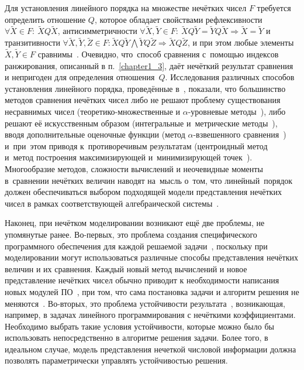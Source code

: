 Для установления линейного порядка на множестве нечётких чисел $F$ требуется определить отношение $Q$, которое обладает свойствами рефлексивности $\forall \tilde X \in F:\ \tilde X Q \tilde X$, антисимметричности $\forall \tilde X, \tilde Y \in F:\allowbreak\ \tilde X Q \tilde Y = \tilde Y Q \tilde X \Rightarrow \tilde X = \tilde Y$ и транзитивности $\forall \tilde X, \tilde Y, \tilde Z \in F:\allowbreak \tilde X Q \tilde Y \bigwedge \tilde Y Q \tilde Z \Rightarrow \tilde X Q \tilde Z$, и при этом любые элементы $\tilde X, \tilde Y \in F$ сравнимы~\cite{Vorontsov_Compare}. Очевидно, что~способ сравнения с~помощью индексов ранжирования, описанный в п.~\ref{chapter1_3}, даёт нечёткий результат сравнения и непригоден для определения отношения~$Q$. Исследования различных способов установления линейного порядка, проведённые в~\cite{Vorontsov_Compare}, показали, что большинство методов сравнения нечётких чисел либо не решают проблему существования несравнимых чисел (теоретико-множественные и $\alpha$-уровневые методы~\cite{Cheng_Comparison, Zak}), либо решают её искусственным образом (интегральные и~метрические методы~\cite{Skorokhod, Ledeneva_Nguen}), вводя дополнительные оценочные функции (метод $\alpha$-взвешенного сравнения~\cite{Detyniecki_Yager, Ukhobotov_Comparison, Ledeneva_VSTU_Comparison}) и~при~этом приводя к~противоречивым результатам (центроидный метод~\cite{Centroid} и~метод построения максимизирующей и~минимизирующей точек~\cite{Max_Min_Points}). Многообразие методов, сложности вычислений и неочевидные моменты в~сравнении нечётких величин наводят на~мысль о~том, что линейный~порядок должен обеспечиваться выбором подходящей модели представления нечётких чисел в рамках соответствующей алгебраической системы~\cite{Kosinski}.

Наконец, при нечётком моделировании возникают ещё две проблемы, не упомянутые ранее. Во-первых, это проблема создания специфического программного обеспечения для каждой решаемой задачи~\cite{Uskov_Complex}, поскольку при моделировании могут использоваться различные способы представления нечётких величин и их сравнения. Каждый новый метод вычислений и новое представление нечётких чисел обычно приводит к необходимости написания новых модулей ПО~\cite{Gallyamov}, при том, что сама постановка задачи и алгоритм решения не меняются~\cite{Koroteev_Fuzzy_Arithmetics}. Во-вторых, это проблема устойчивости результата~\cite{Fuller}, возникающая, например, в задачах линейного программирования с нечёткими коэффициентами.  Необходимо выбрать такие условия устойчивости, которые можно было бы использовать непосредственно в алгоритме решения задачи. Более того, в идеальном случае, модель представления нечеткой числовой информации должна позволять параметрически управлять устойчивостью решения.

